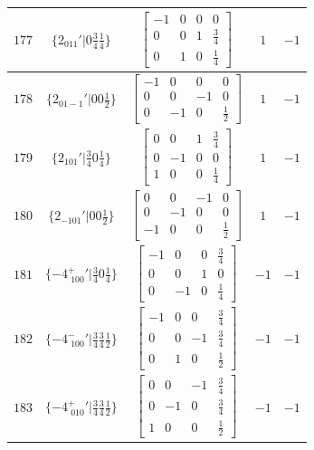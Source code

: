 \documentclass[fleqn,8pt]{jsarticle}
\begin{document}
\begin{longtable}{ccccc}
$ 177 $ & $ \{2{}_{011}{}'|0 \frac{3}{4} \frac{1}{4}\} $ & $ \begin{bmatrix} -1 & 0 & 0 & 0 \\ 0 & 0 & 1 & \frac{3}{4} \\ 0 & 1 & 0 & \frac{1}{4} \end{bmatrix} $ & $ 1 $ & $ -1 $ \\ \hline
$ 178 $ & $ \{2{}_{01-1}{}'|0 0 \frac{1}{2}\} $ & $ \begin{bmatrix} -1 & 0 & 0 & 0 \\ 0 & 0 & -1 & 0 \\ 0 & -1 & 0 & \frac{1}{2} \end{bmatrix} $ & $ 1 $ & $ -1 $ \\ \hline
$ 179 $ & $ \{2{}_{101}{}'|\frac{3}{4} 0 \frac{1}{4}\} $ & $ \begin{bmatrix} 0 & 0 & 1 & \frac{3}{4} \\ 0 & -1 & 0 & 0 \\ 1 & 0 & 0 & \frac{1}{4} \end{bmatrix} $ & $ 1 $ & $ -1 $ \\ \hline
$ 180 $ & $ \{2{}_{-101}{}'|0 0 \frac{1}{2}\} $ & $ \begin{bmatrix} 0 & 0 & -1 & 0 \\ 0 & -1 & 0 & 0 \\ -1 & 0 & 0 & \frac{1}{2} \end{bmatrix} $ & $ 1 $ & $ -1 $ \\ \hline
$ 181 $ & $ \{-4^{+}_{\,\,100}{}'|\frac{3}{4} 0 \frac{1}{4}\} $ & $ \begin{bmatrix} -1 & 0 & 0 & \frac{3}{4} \\ 0 & 0 & 1 & 0 \\ 0 & -1 & 0 & \frac{1}{4} \end{bmatrix} $ & $ -1 $ & $ -1 $ \\ \hline
$ 182 $ & $ \{-4^{-}_{\,\,100}{}'|\frac{3}{4} \frac{3}{4} \frac{1}{2}\} $ & $ \begin{bmatrix} -1 & 0 & 0 & \frac{3}{4} \\ 0 & 0 & -1 & \frac{3}{4} \\ 0 & 1 & 0 & \frac{1}{2} \end{bmatrix} $ & $ -1 $ & $ -1 $ \\ \hline
$ 183 $ & $ \{-4^{+}_{\,\,010}{}'|\frac{3}{4} \frac{3}{4} \frac{1}{2}\} $ & $ \begin{bmatrix} 0 & 0 & -1 & \frac{3}{4} \\ 0 & -1 & 0 & \frac{3}{4} \\ 1 & 0 & 0 & \frac{1}{2} \end{bmatrix} $ & $ -1 $ & $ -1 $ \\ \hline

\end{longtable}
\end{document}
